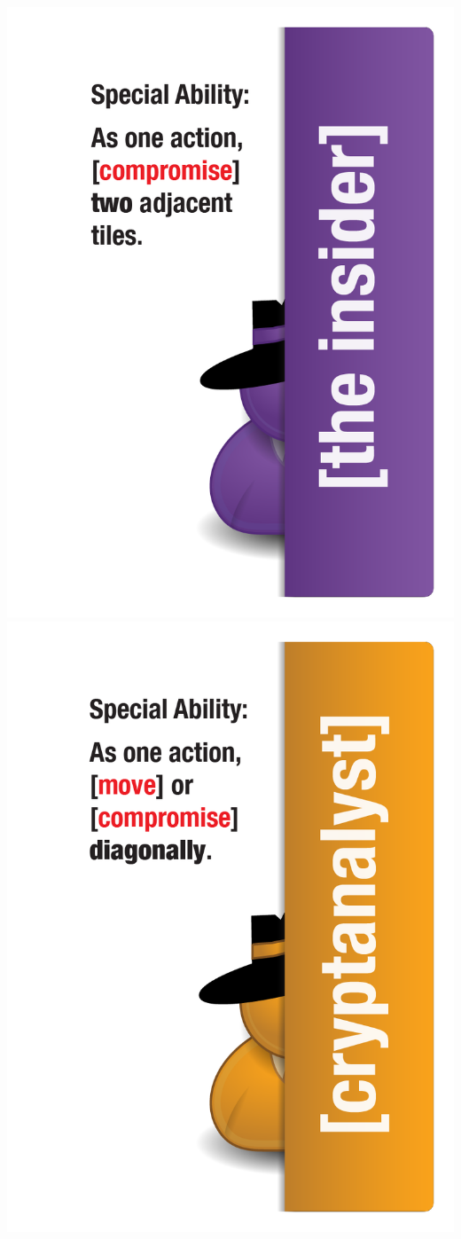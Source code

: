 \documentclass{letter}
\begin{document}
\includegraphics{characters/character_insider}
\includegraphics{characters/character_cryptanalyst}
\end{document}
